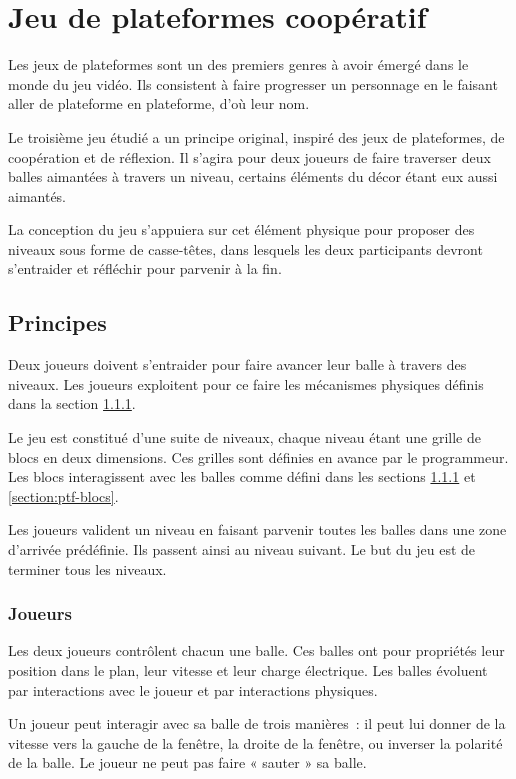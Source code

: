 \chapter{Jeu de plateformes coopératif}

Les jeux de plateformes sont un des premiers genres
à avoir émergé dans le monde du jeu vidéo. Ils consistent
à faire progresser un personnage en le faisant aller
de plateforme en plateforme, d'où leur nom.

Le troisième jeu étudié a un principe original, inspiré
des jeux de plateformes, de coopération et de réflexion. Il
s'agira pour deux joueurs de faire traverser deux balles
aimantées à travers un niveau, certains éléments du décor
étant eux aussi aimantés.

La conception du jeu s'appuiera sur cet élément
physique pour proposer des niveaux sous forme de casse-têtes,
dans lesquels les deux participants devront s'entraider et
réfléchir pour parvenir à la fin.

\section{Principes}

Deux joueurs doivent s'entraider pour faire avancer leur balle à travers
des niveaux. Les joueurs exploitent pour ce faire les mécanismes
physiques définis dans la section \ref{section:ptf-joueurs}.

Le jeu est constitué d'une suite de niveaux, chaque niveau
étant une grille de blocs en deux dimensions. Ces grilles sont
définies en avance par le programmeur. Les blocs interagissent
avec les balles comme défini dans les sections \ref{section:ptf-joueurs}
et \ref{section:ptf-blocs}.

Les joueurs valident un niveau en faisant parvenir toutes les
balles dans une zone d'arrivée prédéfinie. Ils passent
ainsi au niveau suivant. Le but du jeu est de terminer tous
les niveaux.

\subsection{Joueurs}
\label{section:ptf-joueurs}

Les deux joueurs contrôlent chacun une balle. Ces balles ont pour
propriétés leur position dans le plan, leur vitesse et leur charge
électrique. Les balles évoluent par interactions
avec le joueur et par interactions physiques.

Un joueur peut interagir avec sa balle de trois manières~:
il peut lui donner de la vitesse vers la gauche de la fenêtre,
la droite de la fenêtre, ou inverser la polarité de la balle.
Le joueur ne peut pas faire « sauter » sa balle.

